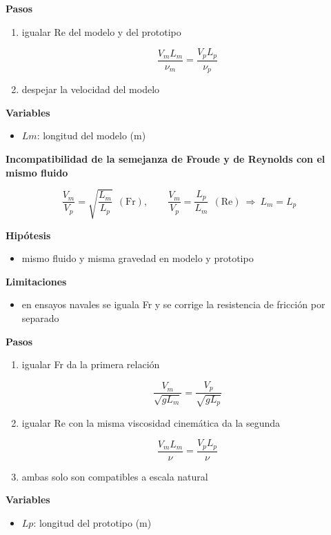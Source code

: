 \documentclass[10pt,openany]{book}
\begin{document}
\begin{tcolorbox}[title={Desarrollos del modelo}, studiumdef, breakable]
\noindent\textbf{Pasos}
\begin{enumerate}
\item
igualar Re del modelo y del prototipo

\[
\frac{V_m L_m}{\nu_m} = \frac{V_p L_p}{\nu_p}
\]
\item
despejar la velocidad del modelo
\end{enumerate}

\noindent\textbf{Variables}
\begin{itemize}
\item $Lm$: longitud del modelo ($\mathrm{m}$)
\end{itemize}



\noindent\textbf{Incompatibilidad de la semejanza de Froude y de Reynolds con el mismo fluido}

\begin{equation}
\frac{V_m}{V_p} = \sqrt{\frac{L_m}{L_p}}\ \ (\mathrm{Fr}),\qquad \frac{V_m}{V_p} = \frac{L_p}{L_m}\ \ (\mathrm{Re}) \ \Rightarrow\ L_m = L_p
\label{eq:c10-froude-reynolds}
\end{equation}

\noindent\textbf{Hipótesis}
\begin{itemize}
\item mismo fluido y misma gravedad en modelo y prototipo
\end{itemize}

\noindent\textbf{Limitaciones}
\begin{itemize}
\item en ensayos navales se iguala Fr y se corrige la resistencia de fricción por separado
\end{itemize}

\noindent\textbf{Pasos}
\begin{enumerate}
\item
igualar Fr da la primera relación

\[
\frac{V_m}{\sqrt{g L_m}} = \frac{V_p}{\sqrt{g L_p}}
\]
\item
igualar Re con la misma viscosidad cinemática da la segunda

\[
\frac{V_m L_m}{\nu} = \frac{V_p L_p}{\nu}
\]
\item
ambas solo son compatibles a escala natural
\end{enumerate}

\noindent\textbf{Variables}
\begin{itemize}
\item $Lp$: longitud del prototipo ($\mathrm{m}$)
\end{itemize}




\end{tcolorbox}
\end{document}
